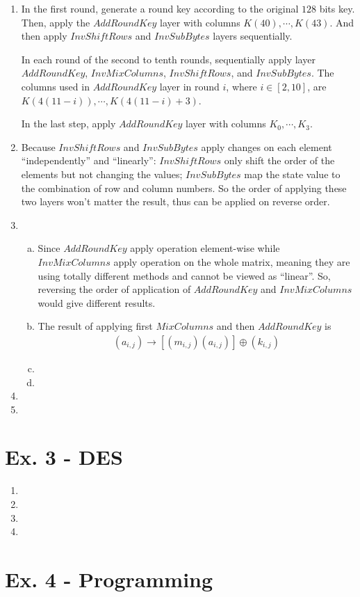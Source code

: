 \documentclass[11pt,a4paper]{article}
\begin{document}
\begin{enumerate}
	\item In the first round, generate a round key according to the original $128$ bits key. Then, apply the $\mathit{AddRoundKey}$ layer with columns $K(40),\cdots,K(43)$. And then apply $\mathit{InvShiftRows}$ and $\mathit{InvSubBytes}$ layers sequentially.
	\par In each round of the second to tenth rounds, sequentially apply layer $\mathit{AddRoundKey}$, $\mathit{InvMixColumns}$, $\mathit{InvShiftRows}$, and $\mathit{InvSubBytes}$. The columns used in $\mathit{AddRoundKey}$ layer in round $i$, where $i\in [2,10]$, are $K(4(11-i)),\cdots,K(4(11-i)+3)$.
	\par In the last step, apply $\mathit{AddRoundKey}$ layer with columns $K_{0},\cdots,K_{3}$.
	
	\item Because $\mathit{InvShiftRows}$ and $\mathit{InvSubBytes}$ apply changes on each element ``independently'' and ``linearly'': $\mathit{InvShiftRows}$ only shift the order of the elements but not changing the values; $\mathit{InvSubBytes}$ map the state value to the combination of row and column numbers. So the order of applying these two layers won't matter the result, thus can be applied on reverse order.

	\item
	\begin{enumerate}[(a)]
		\item Since $\mathit{AddRoundKey}$ apply operation element-wise while $\mathit{InvMixColumns}$ apply operation on the whole matrix, meaning they are using totally different methods and cannot be viewed as ``linear''. So, reversing the order of application of $\mathit{AddRoundKey}$ and $\mathit{InvMixColumns}$ would give different results.
		
		\item The result of applying first $\mathit{MixColumns}$ and then $\mathit{AddRoundKey}$ is
		\begin{align*}
			(a_{i,j}) \longrightarrow [(m_{i,j})(a_{i,j})] \oplus (k_{i,j})
		\end{align*}
		
		\item 
		
		\item
		
	\end{enumerate}
	
	\item
	
	\item
	 
\end{enumerate}

\section*{Ex. 3 - DES}
\begin{enumerate}
	\item
	
	\item
	
	\item
	
	\item
\end{enumerate}

\section*{Ex. 4 - Programming}
\end{document}
